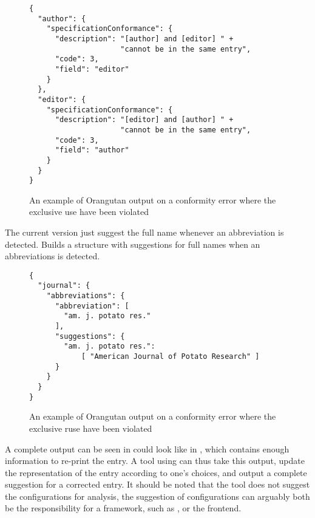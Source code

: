 \begin{figure}
  \centering
\begin{verbatim}
{
  "author": {
    "specificationConformance": {
      "description": "[author] and [editor] " +
                     "cannot be in the same entry",
      "code": 3,
      "field": "editor"
    }
  },
  "editor": {
    "specificationConformance": {
      "description": "[editor] and [author] " +
                     "cannot be in the same entry",
      "code": 3,
      "field": "author"
    }
  }
}
\end{verbatim}
\caption{An example of Orangutan output on a conformity error where
  the exclusive use have been violated}
\label{fig:orgazing_nonconformity}
\end{figure}

The current version just suggest the full name whenever an
abbreviation is detected.  Builds a structure with suggestions for
full names when an abbreviations is detected.

\begin{figure}
  \centering
\begin{verbatim}
{
  "journal": {
    "abbreviations": {
      "abbreviation": [
        "am. j. potato res."
      ],
      "suggestions": {
        "am. j. potato res.":
            [ "American Journal of Potato Research" ]
      }
    }
  }
}
\end{verbatim}
\caption{An example of Orangutan output on a conformity error where
  the exclusive ruse have been violated}
\label{fig:orgazing_abbreviation}
\end{figure}

A complete output can be seen in could look like in
, which contains enough information to
re-print the entry.  A tool using {\orangutan} can thus take this
output, update the representation of the entry according to one's
choices, and output a complete suggestion for a corrected entry.  It
should be noted that the tool does not suggest the configurations for
analysis, the suggestion of configurations can arguably both be the
responsibility for a framework, such as {\orangutan}, or the frontend.

